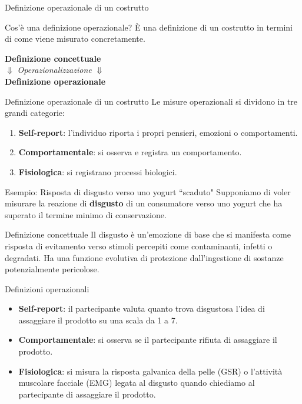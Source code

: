 \documentclass{beamer}
\begin{document}
\begin{frame}{Definizione operazionale di un costrutto}
  \begin{block}{Cos'è una definizione operazionale?}
    È una definizione di un costrutto in termini di come viene misurato concretamente.
  \end{block}
  \pause
\vspace{0.8cm}
  \begin{center}
      \textbf{Definizione concettuale} \\
      \bigskip
      $\Downarrow$ \quad \textit{\small Operazionalizzazione} \quad $\Downarrow$ \\
      \bigskip
      \textbf{Definizione operazionale} \\
  \end{center}
\end{frame}

  
\begin{frame}{Definizione operazionale di un costrutto}
  Le misure operazionali si dividono in tre grandi categorie:
  \begin{enumerate}
      \item \textbf{Self-report}: l'individuo riporta i propri pensieri, emozioni o comportamenti.
      \item \textbf{Comportamentale}: si osserva e registra un comportamento.
      \item \textbf{Fisiologica}: si registrano processi biologici.
    \end{enumerate}
\end{frame}

\begin{frame}{Esempio: Risposta di disgusto verso uno yogurt “scaduto"}
\small
  Supponiamo di voler misurare la reazione di \textbf{disgusto} di un consumatore verso uno yogurt che ha superato il termine minimo di conservazione.
  \pause
      \begin{block}{Definizione concettuale}
    Il disgusto è un'emozione di base che si manifesta come risposta di evitamento verso stimoli percepiti come contaminanti, infetti o degradati. Ha una funzione evolutiva di protezione dall'ingestione di sostanze potenzialmente pericolose.
  \end{block}
  \pause
    \begin{block}{Definizioni operazionali}
  \begin{itemize}
    \item \textbf{Self-report}: il partecipante valuta quanto trova disgustosa l'idea di assaggiare il prodotto su una scala da 1 a 7.
    \item \textbf{Comportamentale}: si osserva se il partecipante rifiuta di assaggiare il prodotto.
    \item \textbf{Fisiologica}: si misura la risposta galvanica della pelle (GSR) o l'attività muscolare facciale (EMG) legata al disgusto quando chiediamo al partecipante di assaggiare il prodotto.
  \end{itemize}
\end{block}
\end{frame}
\end{document}
